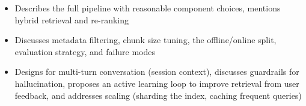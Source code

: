 \begin{interviewq}

\goodgreat
\begin{itemize}
    \item {} Describes the full pipeline with reasonable component choices,
          mentions hybrid retrieval and re-ranking
    \item {} Discusses metadata filtering, chunk size tuning, the
          offline/online split, evaluation strategy, and failure modes
    \item {} Designs for multi-turn conversation (session context),
          discusses guardrails for hallucination, proposes an active learning loop
          to improve retrieval from user feedback, and addresses scaling (sharding
          the index, caching frequent queries)
\end{itemize}

\end{interviewq}

\bigskip

